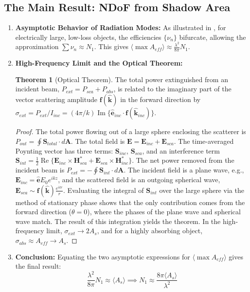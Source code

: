 \documentclass[12pt,a4paper]{article}
\theoremstyle{definition}
\newtheorem{theorem}{Theorem}[section]
\newcommand{\vect}[1]{\mathbf{#1}}
\newcommand{\uvect}[1]{\mathbf{\hat{#1}}}
\newcommand\re{\operatorname{Re}}
\newcommand\im{\operatorname{Im}}
\begin{document}
\subsection{The Main Result: NDoF from Shadow Area}
\begin{enumerate}
    \item \textbf{Asymptotic Behavior of Radiation Modes:} As illustrated in \cite[Figs. 5, 10]{Gustafsson2025}, for electrically large, low-loss objects, the efficiencies $\{\nu_n\}$ bifurcate, allowing the approximation $\sum \nu_n \approx N_1$. This gives $\langle \max A_{eff} \rangle \approx \frac{\lambda^2}{8\pi} N_1$.

    \item \textbf{High-Frequency Limit and the Optical Theorem:}
    \begin{theorem}[Optical Theorem]
    The total power extinguished from an incident beam, $P_{ext} = P_{sca} + P_{abs}$, is related to the imaginary part of the vector scattering amplitude $\vect{f}(\uvect{k})$ in the forward direction by $\sigma_{ext} = P_{ext}/I_{inc} = (4\pi/k)\im\{\uvect{e}_{inc} \cdot \vect{f}(\uvect{k}_{inc})\}$.
    \end{theorem}
    \begin{proof}
    The total power flowing out of a large sphere enclosing the scatterer is $P_{out} = \oint \vect{S}_{total} \cdot d\vect{A}$. The total field is $\vect{E} = \vect{E}_{inc} + \vect{E}_{sca}$. The time-averaged Poynting vector has three terms: $\vect{S}_{inc}$, $\vect{S}_{sca}$, and an interference term $\vect{S}_{int} = \frac{1}{2}\re\{\vect{E}_{inc}\times\vect{H}_{sca}^* + \vect{E}_{sca}\times\vect{H}_{inc}^*\}$. The net power removed from the incident beam is $P_{ext} = - \oint \vect{S}_{int} \cdot d\vect{A}$. The incident field is a plane wave, e.g., $\vect{E}_{inc} = \uvect{e} E_0 e^{ikz}$, and the scattered field is an outgoing spherical wave, $\vect{E}_{sca} \sim \vect{f}(\uvect{k}) \frac{e^{ikr}}{r}$. Evaluating the integral of $\vect{S}_{int}$ over the large sphere via the method of stationary phase shows that the only contribution comes from the forward direction ($\theta=0$), where the phases of the plane wave and spherical wave match. The result of this integration yields the theorem. In the high-frequency limit, $\sigma_{ext} \to 2A_s$, and for a highly absorbing object, $\sigma_{abs} \approx A_{eff} \to A_s$.
    \end{proof}

    \item \textbf{Conclusion:} Equating the two asymptotic expressions for $\langle \max A_{eff} \rangle$ gives the final result:
    $$
    \frac{\lambda^2}{8\pi} N_1 \approx \langle A_s \rangle \implies \boxed{N_1 \approx \frac{8\pi \langle A_s \rangle}{\lambda^2}}
    $$
\end{enumerate}
\end{document}
